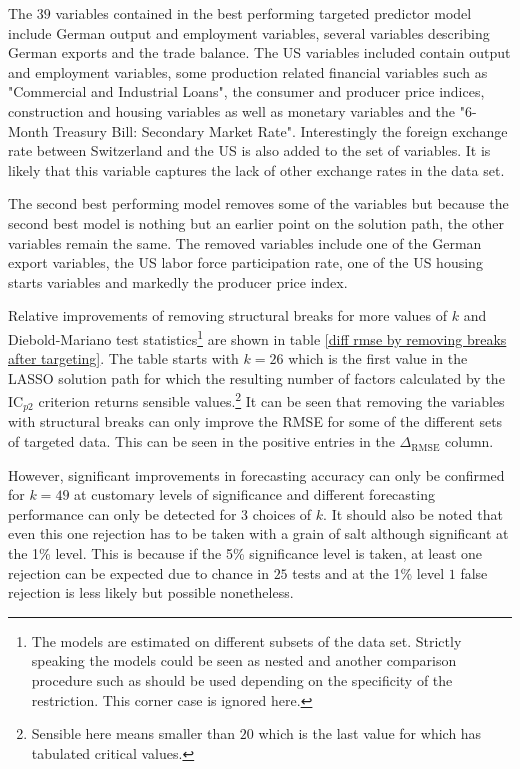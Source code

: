 \documentclass[12pt]{article}
\begin{document}
The $39$ variables contained in the best performing targeted predictor model include German output and employment variables, several variables describing German exports and the trade balance. The US variables included contain output and employment variables, some production related financial variables such as "Commercial and Industrial Loans", the consumer and producer price indices, construction and housing variables as well as monetary variables and the "6-Month Treasury Bill: Secondary Market Rate". Interestingly the foreign exchange rate between Switzerland and the US is also added to the set of variables. It is likely that this variable captures the lack of other exchange rates in the data set.

The second best performing model removes some of the variables but because the second best model is nothing but an earlier point on the solution path, the other variables remain the same. The removed variables include one of the German export variables, the US labor force participation rate, one of the US housing starts variables and markedly the producer price index.


Relative improvements of removing structural breaks for more values of $k$ and Diebold-Mariano test statistics\footnote{The models are estimated on different subsets of the data set. Strictly speaking the models could be seen as nested and another comparison procedure such as \citet{clark2001tests} should be used depending on the specificity of the restriction. This corner case is ignored here.} are shown in table \ref{diff rmse by removing breaks after targeting}. The table starts with $k=26$ which is the first value in the LASSO solution path for which the resulting number of factors calculated by the IC$_{p2}$ criterion returns sensible values.\footnote{Sensible here means smaller than $20$ which is the last value for which \citet{andrews2003tests} has tabulated critical values.}
It can be seen that removing the variables with structural breaks can only improve the RMSE for some of the different sets of targeted data. This can be seen in the positive entries in the $\Delta_{\text{RMSE}}$ column.

However, significant improvements in forecasting accuracy can only be confirmed for $k=49$ at customary levels of significance and different forecasting performance can only be detected for $3$ choices of $k$. It should also be noted that even this one rejection has to be taken with a grain of salt although significant at the 1\% level. This is because if the 5\% significance level is taken, at least one rejection can be expected due to chance in $25$ tests and at the 1\% level $1$ false rejection is less likely but possible nonetheless.
\end{document}

